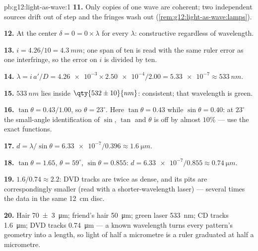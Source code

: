 \begin{solution}{pb:g12:light-as-wave:1}
\textbf{11.} Only copies of one wave are coherent; two independent
sources drift out of step and the fringes wash out
(\cref{rem:g12:light-as-wave:lamps}).

\textbf{12.} At the center $\delta = 0 = 0 \times \lambda$ for every
$\lambda$: constructive regardless of wavelength.

\textbf{13.} $i = 4.26/10 = \qty{4.3}{mm}$; one span of ten is read
with the same ruler error as one interfringe, so the error on $i$ is
divided by ten.

\textbf{14.} $\lambda = i\,a'/D = \num{4.26e-3} \times
\num{2.50e-4}/2.00 = \num{5.33e-7} \approx \qty{533}{nm}$.

\textbf{15.} $\qty{533}{nm}$ lies inside $\qty{532 \pm 10}{nm}$:
consistent; that wavelength is green.

\textbf{16.} $\tan\theta = 0.43/1.00$, so $\theta = 23^\circ$. Here
$\tan\theta = 0.43$ while $\sin\theta = 0.40$: at $23^\circ$ the
small-angle identification of $\sin$, $\tan$ and $\theta$ is off by
almost $10\%$ --- use the exact functions.

\textbf{17.} $d = \lambda/\sin\theta = \num{6.33e-7}/0.396 \approx
\qty{1.6}{\micro m}$.

\textbf{18.} $\tan\theta = 1.65$, $\theta = 59^\circ$,
$\sin\theta = 0.855$: $d = \num{6.33e-7}/0.855 \approx
\qty{0.74}{\micro m}$.

\textbf{19.} $1.6/0.74 \approx 2.2$: DVD tracks are twice as dense,
and its pits are correspondingly smaller (read with a
shorter-wavelength laser) --- several times the data in the same
\qty{12}{cm} disc.

\textbf{20.} Hair \qty{70 \pm 3}{\micro m}; friend's hair
\qty{50}{\micro m}; green laser \qty{533}{nm}; CD tracks
\qty{1.6}{\micro m}; DVD tracks \qty{0.74}{\micro m} --- a known
wavelength turns every pattern's geometry into a length, so light of
half a micrometre is a ruler graduated at half a micrometre.
\end{solution}
